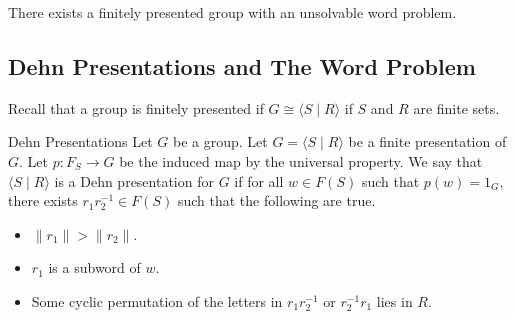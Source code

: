 \documentclass[a4paper]{article}
\begin{document}
\begin{thm}{}{} There exists a finitely presented group with an unsolvable word problem. 
\end{thm}

\subsection{Dehn Presentations and The Word Problem}
Recall that a group is finitely presented if $G\cong\langle S\;|\;R\rangle$ if $S$ and $R$ are finite sets. 

\begin{defn}{Dehn Presentations}{} Let $G$ be a group. Let $G=\langle S\;|\;R\rangle$ be a finite presentation of $G$. Let $p:F_S\to G$ be the induced map by the universal property. We say that $\langle S\;|\;R\rangle$ is a Dehn presentation for $G$ if for all $w\in F(S)$ such that $p(w)=1_G$, there exists $r_1r_2^{-1}\in F(S)$ such that the following are true. 
\begin{itemize}
\item $\|r_1\|>\|r_2\|$. 
\item $r_1$ is a subword of $w$. 
\item Some cyclic permutation of the letters in $r_1r_2^{-1}$ or $r_2^{-1}r_1$ lies in $R$. 
\end{itemize}
\end{defn}
\end{document}
